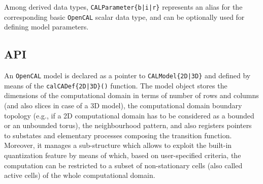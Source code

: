 Among derived data types, \verb'CALParameter{b|i|r}' represents an
alias for the corresponding basic \texttt{OpenCAL} scalar data type, and can
be optionally used for defining model parameters.


\subsection{API}
An \texttt{OpenCAL} model is declared as a pointer to \verb'CALModel{2D|3D}'
and defined by means of the \verb'calCADef{2D|3D}()' function. The
model object stores the dimensions of the computational domain in
terms of number of rows and columns (and also slices in case of a 3D
model), the computational domain boundary topology (e.g., if a 2D
computational domain has to be considered as a bounded or an
unbounded torus), the neighbourhood pattern, and also registers
pointers to substates and elementary processes composing the
transition function. Moreover, it manages a sub-structure which
allows to exploit the built-in quantization feature by means of
which, based on user-specified criteria, the computation can be
restricted to a subset of non-stationary cells (also called active
cells) of the whole computational domain.

